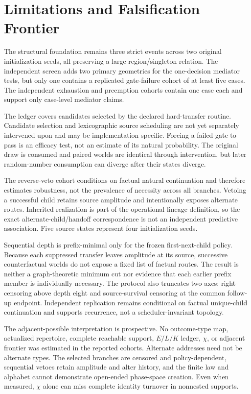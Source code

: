 \section{Limitations and Falsification Frontier}
\label{sec:limitations}

The structural foundation remains three strict events across two original
initialization seeds, all preserving a large-region/singleton relation. The
independent screen adds two primary geometries for the one-decision mediator
tests, but only one contains a replicated gate-failure cohort of at least five
cases. The independent exhaustion and preemption cohorts contain one case each
and support only case-level mediator claims.

The ledger covers candidates selected by the declared hard-transfer routine.
Candidate selection and lexicographic source scheduling are not yet separately
intervened upon and may be implementation-specific. Forcing a failed gate to
pass is an efficacy test, not an estimate of its natural probability. The
original draw is consumed and paired worlds are identical through intervention,
but later random-number consumption can diverge after their states diverge.

The reverse-veto cohort conditions on factual natural continuation and therefore
estimates robustness, not the prevalence of necessity across all branches.
Vetoing a successful child retains source amplitude and intentionally exposes
alternate routes. Inherited realization is part of the operational lineage
definition, so the exact alternate-child/handoff correspondence is not an
independent predictive association. Five source states represent four
initialization seeds.

Sequential depth is prefix-minimal only for the frozen first-next-child policy.
Because each suppressed transfer leaves amplitude at its source, successive
counterfactual worlds do not expose a fixed list of factual routes. The result
is neither a graph-theoretic minimum cut nor evidence that each earlier prefix
member is individually necessary. The protocol also truncates two axes:
right-censoring above depth eight and source-survival censoring at the common
follow-up endpoint. Independent replication remains conditional on factual
unique-child continuation and supports recurrence, not a scheduler-invariant
topology.

The adjacent-possible interpretation is prospective. No outcome-type map,
actualized repertoire, complete reachable support, $E/L/K$ ledger,
$\chi$, or adjacent frontier was estimated in the reported cohorts. Alternate
addresses need not be alternate types. The selected branches are censored and
policy-dependent, sequential vetoes retain amplitude and alter history, and the
finite law and alphabet cannot demonstrate open-ended phase-space creation.
Even when measured, $\chi$ alone can miss complete identity turnover in
nonnested supports.

